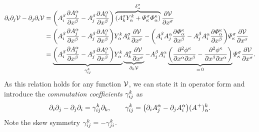 \allowdisplaybreaks
\begin{align}\label{eq:DerivationCommCoeff2}
 \dirDiff{\LidxI} \dirDiff{\LidxII} \potentialEnergy - \dirDiff{\LidxII} \dirDiff{\LidxI} \potentialEnergy 
 &= \bigg(\kinMatCoeff{\GidxII}{\LidxI} \pdiff[\kinMatCoeff{\GidxI}{\LidxII}]{\sysCoordCoeff{\GidxII}} - \kinMatCoeff{\GidxII}{\LidxII} \pdiff[\kinMatCoeff{\GidxI}{\LidxI}]{\sysCoordCoeff{\GidxII}}\bigg) \overbrace{(\kinMatCoeff{\GidxIII}{\LidxIII} \kinBasisMatCoeff{\LidxIII}{\GidxI} + \InvGeoConstraintMatCoeff{\GidxIII}{\CidxI}\geoConstraintMatCoeff{\CidxI}{\GidxI})}^{\delta^{\GidxIII}_{\GidxI}}  \pdiff[\potentialEnergy]{\sysCoordCoeff{\GidxIII}}
\nonumber\\
 &= \bigg(\kinMatCoeff{\GidxII}{\LidxI} \pdiff[\kinMatCoeff{\GidxI}{\LidxII}]{\sysCoordCoeff{\GidxII}} - \kinMatCoeff{\GidxII}{\LidxII} \pdiff[\kinMatCoeff{\GidxI}{\LidxI}]{\sysCoordCoeff{\GidxII}}\bigg) \kinBasisMatCoeff{\LidxIII}{\GidxI} \kinMatCoeff{\GidxIII}{\LidxIII} \pdiff[\potentialEnergy]{\sysCoordCoeff{\GidxIII}}
 - \bigg(\kinMatCoeff{\GidxII}{\LidxI} \kinMatCoeff{\GidxI}{\LidxII} \pdiff[\geoConstraintMatCoeff{\CidxI}{\GidxI}]{\sysCoordCoeff{\GidxII}} - \kinMatCoeff{\GidxII}{\LidxII} \kinMatCoeff{\GidxI}{\LidxI} \pdiff[\geoConstraintMatCoeff{\CidxI}{\GidxI}]{\sysCoordCoeff{\GidxII}} \bigg) \InvGeoConstraintMatCoeff{\GidxIII}{\CidxI} \pdiff[\potentialEnergy]{\sysCoordCoeff{\GidxIII}}
\nonumber\\
 &= \underbrace{\bigg(\kinMatCoeff{\GidxII}{\LidxI} \pdiff[\kinMatCoeff{\GidxI}{\LidxII}]{\sysCoordCoeff{\GidxII}} - \kinMatCoeff{\GidxII}{\LidxII} \pdiff[\kinMatCoeff{\GidxI}{\LidxI}]{\sysCoordCoeff{\GidxII}}\bigg) \kinBasisMatCoeff{\LidxIII}{\GidxI}}_{\BoltzSym{\LidxIII}{\LidxI}{\LidxII}} \underbrace{\kinMatCoeff{\GidxIII}{\LidxIII} \pdiff[\potentialEnergy]{\sysCoordCoeff{\GidxIII}}}_{\dirDiff{\LidxIII} \potentialEnergy}
 - \kinMatCoeff{\GidxII}{\LidxII} \kinMatCoeff{\GidxI}{\LidxI} \underbrace{\bigg(\frac{\partial^2\geoConstraintCoeff{\CidxI}}{\partial\sysCoordCoeff{\GidxI}\partial\sysCoordCoeff{\GidxII}} - \frac{\partial^2\geoConstraintCoeff{\CidxI}}{\partial\sysCoordCoeff{\GidxII}\partial\sysCoordCoeff{\GidxI}} \bigg)}_{=\,0} \InvGeoConstraintMatCoeff{\GidxIII}{\CidxI} \pdiff[\potentialEnergy]{\sysCoordCoeff{\GidxIII}}
 .
\end{align}
As this relation holds for any function $\potentialEnergy$, we can state it in operator form and introduce the \textit{commutation coefficients} $\BoltzSym{\LidxIII}{\LidxI}{\LidxII}$ as
\begin{align}\label{eq:DefCommutationCoeff}
 \dirDiff{\LidxI} \dirDiff{\LidxII} - \dirDiff{\LidxII} \dirDiff{\LidxI} = \BoltzSym{\LidxIII}{\LidxI}{\LidxII} \dirDiff{\LidxIII},
\qquad
 \BoltzSym{\LidxIII}{\LidxI}{\LidxII} = \big(\dirDiff{\LidxI} \kinMatCoeff{\GidxI}{\LidxII} - \dirDiff{\LidxII} \kinMatCoeff{\GidxI}{\LidxI} \big) ({\kinMatCoeff{}{}}^+)^{\LidxIII}_{\GidxI}.
\end{align}
Note the skew symmetry $\BoltzSym{\LidxIII}{\LidxI}{\LidxII} = -\BoltzSym{\LidxIII}{\LidxII}{\LidxI}$.

